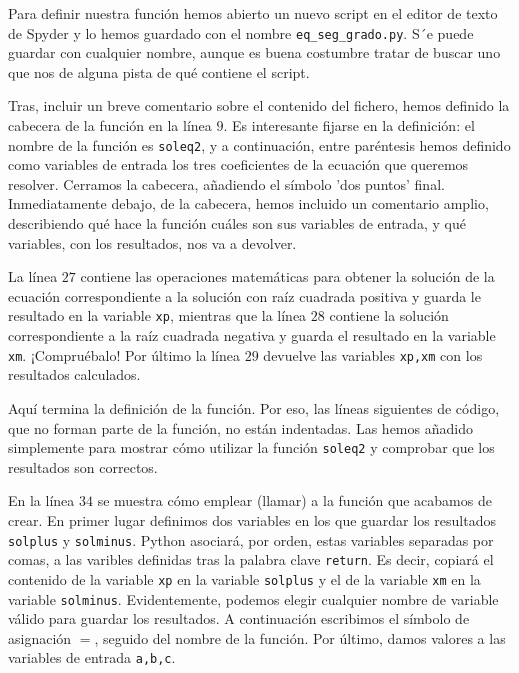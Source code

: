 \begin{paracol}{2}
    Para definir nuestra función hemos abierto un nuevo script en el editor de texto de Spyder y lo hemos guardado con el nombre \texttt{eq\_seg\_grado.py}. S´e puede guardar con cualquier nombre, aunque es buena costumbre tratar de buscar uno que nos de alguna pista de qué contiene el script.

    Tras, incluir un breve comentario sobre el contenido del fichero, hemos definido la cabecera de la función en la línea $9$. Es interesante fijarse en la definición: el nombre de la función es \texttt{soleq2}, y a continuación, entre paréntesis hemos definido como variables de entrada los tres coeficientes de la ecuación que queremos resolver. Cerramos la cabecera, añadiendo el símbolo 'dos puntos' final. Inmediatamente debajo, de la cabecera, hemos incluido un comentario amplio, describiendo qué hace la función cuáles son sus variables de entrada, y qué variables, con los resultados, nos va a devolver.

    La línea $27$ contiene las operaciones matemáticas para obtener la solución de la ecuación correspondiente a la solución con raíz cuadrada positiva y guarda le resultado en la variable \texttt{xp}, mientras que la línea $28$ contiene la solución  correspondiente a la raíz cuadrada negativa y guarda el resultado en la variable \texttt{xm}. ¡Compruébalo!
    Por último la línea $29$ devuelve las variables \texttt{xp,xm} con los resultados calculados.

    Aquí termina la definición de la función. Por eso, las líneas siguientes de código, que no forman parte de la función, no están indentadas. Las hemos añadido simplemente para mostrar cómo utilizar la función \texttt{soleq2} y comprobar que los resultados son correctos.

    En la línea $34$ se muestra cómo emplear (llamar) a la función que acabamos de crear. En primer lugar definimos dos variables en los que guardar los resultados \texttt{solplus} y \texttt{solminus}. Python asociará, por orden, estas variables separadas por comas, a las varibles definidas tras la palabra clave \texttt{return}. Es decir, copiará el contenido de la variable \texttt{xp} en la variable \texttt{solplus} y el de la variable \texttt{xm} en la variable \texttt{solminus}. Evidentemente, podemos elegir cualquier nombre de variable válido para guardar los resultados. A continuación escribimos el símbolo de asignación $=$, seguido del nombre de la función. Por último, damos valores a las variables de entrada \texttt{a,b,c}.


\end{paracol}
